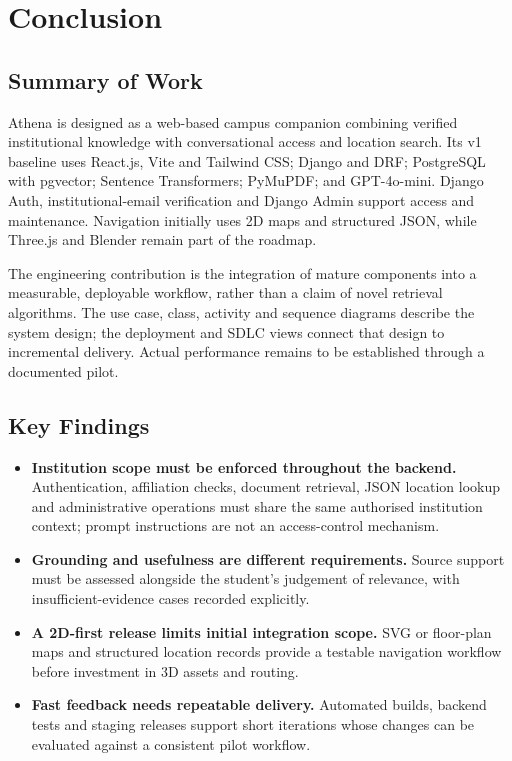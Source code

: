 \documentclass{tietreport}
\begin{document}
\chapter{Conclusion}

\section{Summary of Work}

Athena is designed as a web-based campus companion combining verified
institutional knowledge with conversational access and location search. Its
v1 baseline uses React.js, Vite and Tailwind CSS; Django and DRF; PostgreSQL
with pgvector; Sentence Transformers; PyMuPDF; and GPT-4o-mini. Django Auth,
institutional-email verification and Django Admin support access and maintenance.
Navigation initially uses 2D maps and structured JSON, while Three.js and Blender
remain part of the roadmap.

The engineering contribution is the integration of mature components into a
measurable, deployable workflow, rather than a claim of novel retrieval
algorithms. The use case, class, activity and sequence diagrams describe the
system design; the deployment and SDLC views connect that design to incremental
delivery. Actual performance remains to be established through a documented pilot.

\section{Key Findings}

\begin{itemize}
  \item \textbf{Institution scope must be enforced throughout the backend.}
    Authentication, affiliation checks, document retrieval, JSON location lookup
    and administrative operations must share the same authorised institution
    context; prompt instructions are not an access-control mechanism.
  \item \textbf{Grounding and usefulness are different requirements.} Source
    support must be assessed alongside the student's judgement of relevance,
    with insufficient-evidence cases recorded explicitly.
  \item \textbf{A 2D-first release limits initial integration scope.} SVG or
    floor-plan maps and structured location records provide a testable navigation
    workflow before investment in 3D assets and routing.
  \item \textbf{Fast feedback needs repeatable delivery.} Automated builds,
    backend tests and staging releases support short iterations whose changes
    can be evaluated against a consistent pilot workflow.
\end{itemize}
\end{document}
